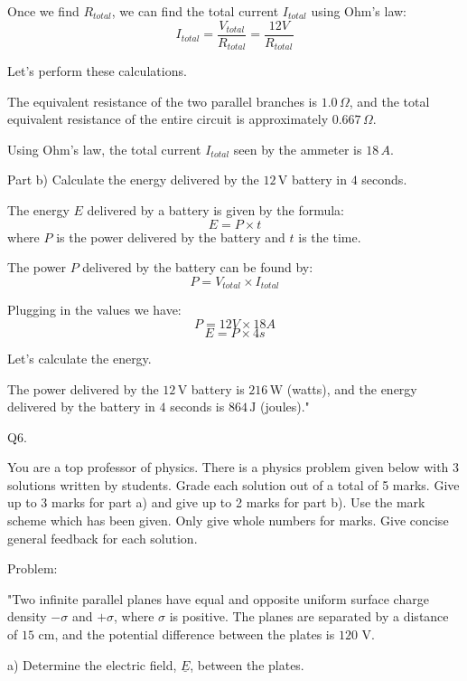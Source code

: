 Once we find \( R_{total} \), we can find the total current \( I_{total} \) using Ohm's law:
\[ I_{total} = \frac{V_{total}}{R_{total}} = \frac{12V}{R_{total}} \]

Let's perform these calculations.

The equivalent resistance of the two parallel branches is \(1.0 \, \Omega\), and the total equivalent resistance of the entire circuit is approximately \(0.667 \, \Omega\). 

Using Ohm's law, the total current \(I_{total}\) seen by the ammeter is \(18 \, A\).

Part b) Calculate the energy delivered by the \(12\, \text{V}\) battery in \(4\) seconds.

The energy \(E\) delivered by a battery is given by the formula:
\[ E = P \times t \]
where \(P\) is the power delivered by the battery and \(t\) is the time.

The power \(P\) delivered by the battery can be found by:
\[ P = V_{total} \times I_{total} \]

Plugging in the values we have:
\[ P = 12V \times 18A \]
\[ E = P \times 4s \]

Let's calculate the energy.

The power delivered by the \(12\, \text{V}\) battery is \(216 \, \text{W}\) (watts), and the energy delivered by the battery in \(4\) seconds is \(864 \, \text{J}\) (joules)."



                           Q6. 

You are a top professor of physics. There is a physics problem given below with 3 solutions written by students. Grade each solution out of a total of 5 marks. Give up to 3 marks for part a) and give up to 2 marks for part b). Use the mark scheme which has been given. Only give whole numbers for marks. Give concise general feedback for each solution. 

Problem:

"Two infinite parallel planes have equal and opposite uniform surface charge density \( -\sigma \) and \( +\sigma \), where \( \sigma \) is positive. The planes are separated by a distance of \( 15 \) cm, and the potential difference between the plates is \( 120 \) V. 

a) Determine the electric field, \( \underline{E} \), between the plates.

